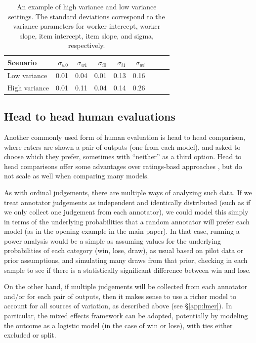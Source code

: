 \documentclass[11pt,a4paper]{article}
\begin{document}
\begin{table}[]
\centering \small
\begin{tabular}{lrrrrrrrr}
  \hline
Scenario & ${\sigma}_{w0}$ & ${\sigma}_{w1}$ & ${\sigma}_{i0}$ & ${\sigma}_{i1}$ &  ${\sigma}_{wi}$ \\ 
  \hline
Low variance & 0.01 & 0.04 & 0.01 & 0.13 & 0.16 \\ 
  High variance & 0.01 & 0.11 & 0.04 & 0.14 & 0.26 \\ 
     \hline
\end{tabular}
\caption{An example of high variance and low variance settings. The standard deviations correspond to the variance parameters for worker intercept, worker slope, item intercept, item slope, and sigma, respectively.} 
\label{table:lmer_recs}
\end{table}

\subsection{Head to head human evaluations}

Another commonly used form of human evaluation is head to head comparison, where raters are shown a pair of outputs (one from each model), and asked to choose which they prefer, sometimes with ``neither'' as a third option. Head to head comparisons offer some advantages over ratings-basd approaches \citep{yannakakis.2015,van2019best}, but do not scale as well when comparing many models.

As with ordinal judgements, there are multiple ways of analyzing such data. If we treat annotator judgements as independent and identically distributed (such as if we only collect one judgement from each annotator), we could model this simply in terms of the underlying probabilities that a random annotator will prefer each model (as in the opening example in the main paper). In that case, running a power analysis would be a simple as assuming values for the underlying probabilities of each category (win, lose, draw), as usual based on pilot data or prior assumptions, and simulating many draws from that prior, checking in each sample to see if there is a statistically significant difference between win and lose. 

On the other hand, if multiple judgements will be collected from each annotator and/or for each pair of outputs, then it makes sense to use a richer model to account for all sources of variation, as described above (see \S\ref{app:lmer}). In particular, the mixed effects framework can be adopted, potentially by modeling the outcome as a logistic model (in the case of win or lose), with ties either excluded or split.
\end{document}
